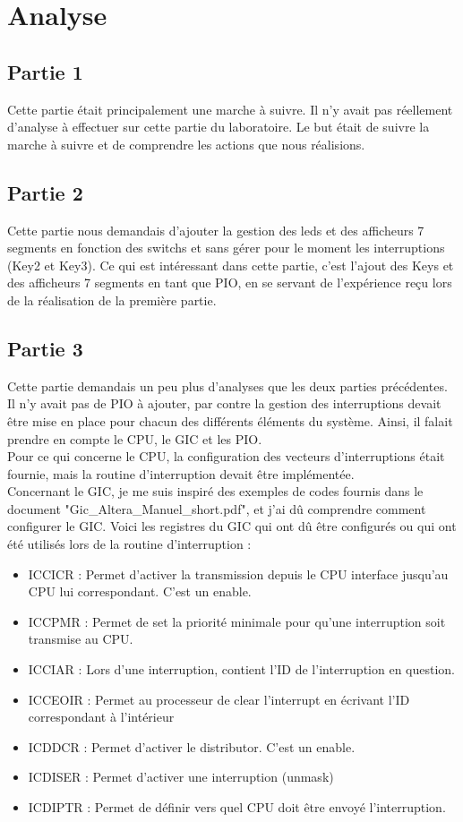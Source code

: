 \section{Analyse}

\subsection{Partie 1}
Cette partie était principalement une marche à suivre. Il n'y avait pas réellement d'analyse à effectuer sur cette partie du laboratoire. Le but était de suivre la marche à suivre et de comprendre les actions que nous réalisions.
\subsection{Partie 2}
Cette partie nous demandais d'ajouter la gestion des leds et des afficheurs 7 segments en fonction des switchs et sans gérer pour le moment les interruptions (Key2 et Key3). Ce qui est intéressant dans cette partie, c'est l'ajout des Keys et des afficheurs 7 segments en tant que PIO, en se servant de l'expérience reçu lors de la réalisation de la première partie.
\subsection{Partie 3}
Cette partie demandais un peu plus d'analyses que les deux parties précédentes. Il n'y avait pas de PIO à ajouter, par contre la gestion des interruptions devait être mise en place pour chacun des différents éléments du système. Ainsi, il falait prendre en compte le CPU, le GIC et les PIO.\\ Pour ce qui concerne le CPU, la configuration des vecteurs d'interruptions était fournie, mais la routine d'interruption devait être implémentée.\\ Concernant le GIC, je me suis inspiré des exemples de codes fournis dans le document "Gic\_Altera\_Manuel\_short.pdf", et j'ai dû comprendre comment configurer le GIC. Voici les registres du GIC qui ont dû être configurés ou qui ont été utilisés lors de la routine d'interruption : \\

\begin{itemize}
	\item ICCICR : Permet d'activer la transmission depuis le CPU interface jusqu'au CPU lui correspondant. C'est un enable.
	\item ICCPMR : Permet de set la priorité minimale pour qu'une interruption soit transmise au CPU.
	\item ICCIAR : Lors d'une interruption, contient l'ID de l'interruption en question.
	\item ICCEOIR : Permet au processeur de clear l'interrupt en écrivant l'ID correspondant à l'intérieur
	\item ICDDCR : Permet d'activer le distributor. C'est un enable.
    \item ICDISER : Permet d'activer une interruption (unmask)
	\item ICDIPTR : Permet de définir vers quel CPU doit être envoyé l'interruption.\\
\end{itemize}

